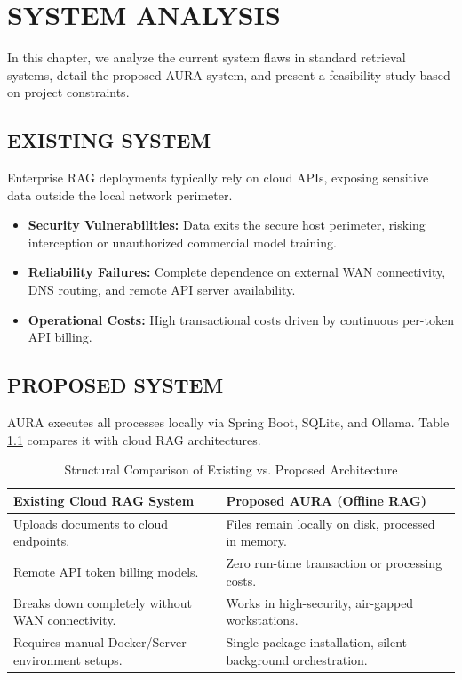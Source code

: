 \documentclass[12pt,a4paper]{report}
\begin{document}
\chapter{SYSTEM ANALYSIS}
\label{ch:system_analysis}

In this chapter, we analyze the current system flaws in standard retrieval systems, detail the proposed AURA system, and present a feasibility study based on project constraints.

\section{EXISTING SYSTEM}
Enterprise RAG deployments typically rely on cloud APIs, exposing sensitive data outside the local network perimeter.
\begin{itemize}
    \item \textbf{Security Vulnerabilities:} Data exits the secure host perimeter, risking interception or unauthorized commercial model training.
    \item \textbf{Reliability Failures:} Complete dependence on external WAN connectivity, DNS routing, and remote API server availability.
    \item \textbf{Operational Costs:} High transactional costs driven by continuous per-token API billing.
\end{itemize}

\section{PROPOSED SYSTEM}
AURA executes all processes locally via Spring Boot, SQLite, and Ollama. Table \ref{tab:existing_vs_proposed} compares it with cloud RAG architectures.

\begin{table}[!ht]
\centering
\footnotesize
\begin{tabularx}{\textwidth}{|X|X|}
\hline
\textbf{Existing Cloud RAG System} & \textbf{Proposed AURA (Offline RAG)} \\ \hline
Uploads documents to cloud endpoints. & Files remain locally on disk, processed in memory. \\ \hline
Remote API token billing models. & Zero run-time transaction or processing costs. \\ \hline
Breaks down completely without WAN connectivity. & Works in high-security, air-gapped workstations. \\ \hline
Requires manual Docker/Server environment setups. & Single package installation, silent background orchestration. \\ \hline
\end{tabularx}
\caption{Structural Comparison of Existing vs. Proposed Architecture}
\label{tab:existing_vs_proposed}
\end{table}
\end{document}
